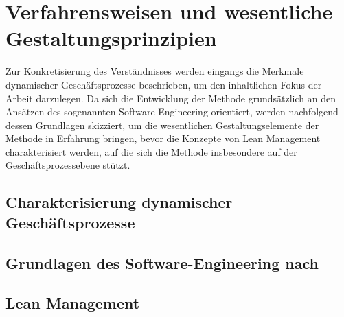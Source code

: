 \section{Verfahrensweisen und wesentliche Gestaltungsprinzipien}\label{sec:methodenGrundlage}
Zur Konkretisierung des Verständnisses werden eingangs die Merkmale dynamischer Geschäftsprozesse beschrieben, um den inhaltlichen Fokus der Arbeit darzulegen.
Da sich die Entwicklung der Methode grundsätzlich an den Ansätzen des sogenannten Software-Engineering orientiert, werden nachfolgend dessen Grundlagen skizziert, um die wesentlichen Gestaltungselemente der Methode in Erfahrung bringen, bevor die Konzepte von Lean Management charakterisiert werden, auf die sich die Methode insbesondere auf der Geschäftsprozessebene stützt.

\subsection{Charakterisierung dynamischer Geschäftsprozesse}

\subsection{Grundlagen des Software-Engineering nach \cite{Scheer.1991}}




\cite{Becker.2001}


\subsection{Lean Management}





